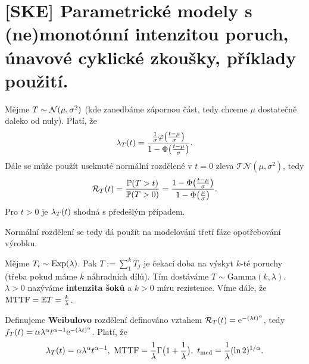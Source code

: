\chapter{[SKE] Parametrické modely s (ne)monotónní intenzitou poruch, únavové cyklické zkoušky, příklady použití.}

\begin{define}
	Mějme $T\sim \mathcal{N}(\mu, \sigma^2)$ (kde zanedbáme zápornou část, tedy chceme $\mu$ dostatečně daleko od nuly). Platí, že 
	$$ \lambda_T(t)=\frac{\frac{1}{\sigma}\varphi\big(\frac{t-\mu}{\sigma}\big)}{1-\Phi\big(\frac{t-\mu}{\sigma}\big)}.$$
		Dále se může použít useknuté normální rozdělené v $t=0$ zleva $\mathcal{TN}(\mu,\sigma^2)$, tedy $$\mathcal{R}_T(t)=\frac{\mathbb{P}(T>t)}{\mathbb{P}(T>0)}=\frac{1-\Phi\big(\frac{t-\mu}{\sigma}\big)}{1-\Phi\big(\frac{\mu}{\sigma}\big)}.$$ Pro $t>0$ je $\lambda_T(t)$ shodná s předešlým případem.
\end{define}

Normální rozdělení se tedy dá použít na modelování třetí fáze opotřebování výrobku.

\begin{define}
Mějme $T_i\sim \mathrm{Exp}(\lambda)$. Pak $T:=\sum_{1}^{k}T_j$ je čekací doba na výskyt $k$-té poruchy (třeba pokud máme $k$ náhradních dílů). Tím dostáváme $T\sim\mathrm{Gamma}(k,\lambda)$. $\lambda>0$ nazýváme \textbf{intenzita šoků} a $k>0$ míru rezistence. Víme dále, že $\mathrm{MTTF}=\mathbb{E} T=\frac{k}{\lambda}$. 
\end{define}

\begin{define}
	Definujeme \textbf{Weibulovo} rozdělení definováno vztahem $\mathcal{R}_T(t)=\mathrm{e}^{-(\lambda t)^\alpha}$, tedy $f_T(t)=\alpha \lambda^\alpha t^{\alpha-1}\mathrm{e}^{-(\lambda t)^\alpha}$. Platí, že
	$$ \lambda_T(t)=\alpha\lambda^\alpha t^{\alpha-1},~\mathrm{MTTF}=\frac{1}{\lambda}\Gamma\big(1+\frac{1}{\lambda}\big),~t_\mathrm{med}=\frac{1}{\lambda}(\ln2)^{1/\alpha}.$$
\end{define}



